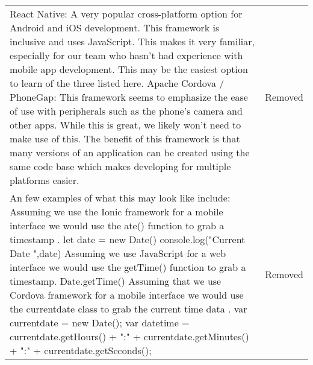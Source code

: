 \documentclass[onecolumn, draftclsnofoot,10pt, compsoc]{IEEEtran}
\begin{document}
\begin{tabular}{| p{} | p{} |}
\noindent
React Native: 
A very popular cross-platform option for Android and iOS development. This framework is inclusive and uses JavaScript. This makes it very familiar, especially for our team who hasn't had experience with mobile app development. This may be the easiest option to learn of the three listed here.
\newline
\newline
Apache Cordova / PhoneGap: 
This framework seems to emphasize the ease of use with peripherals such as the phone's camera and other apps. While this is great, we likely won't need to make use of this. The benefit of this framework is that many versions of an application can be created using the same code base which makes developing for multiple platforms easier.
\newline
\newline
& 
Removed\\
\newline
\newline
An few examples of what this may look like include: 
\newline
\newline
Assuming we use the Ionic framework for a mobile interface we would use the ate() function to grab a timestamp \autocite{ionicforum}.
\newline
\indent let date = new Date()\newline
\indent console.log("Current Date ",date)
\newline
\newline
Assuming we use JavaScript for a web interface we would use the getTime() function to grab a timestamp.
\newline
\indent Date.getTime()
\newline
\newline
Assuming that we use Cordova framework for a mobile interface we would use the currentdate class to grab the current time data \autocite{cordova}.
\newline
\indent var currentdate = new Date(); \newline
\indent var datetime = currentdate.getHours() + ":"\newline
\indent \indent \indent + currentdate.getMinutes() + ":" \newline
\indent \indent \indent + currentdate.getSeconds();\newline
& 
Removed \\
\end{tabular}
\end{document}
